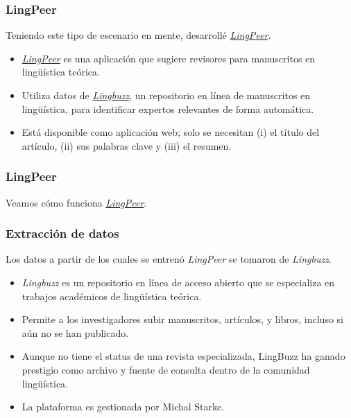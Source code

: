 \documentclass{beamer}
\begin{document}
\begin{frame}
\frametitle{LingPeer}

Teniendo este tipo de escenario en mente, desarrollé \href{https://lingpeer.streamlit.app/}{\alert{\textit{LingPeer}}}.


\begin{itemize}
\item[\ding{52}] \href{https://lingpeer.streamlit.app/}{\alert{\textit{LingPeer}}} es una aplicación que sugiere revisores para manuscritos en lingüística teórica.

\item[\ding{52}] Utiliza datos de \href{https://ling.auf.net/lingbuzz/lingbuzz}{\alert{\textit{Lingbuzz}}}, un repositorio en línea de manuscritos en lingüística, para identificar expertos relevantes de forma automática.

\item[\ding{52}] Está disponible como aplicación web; solo se necesitan (i) el título del artículo, (ii) sus palabras clave y (iii) el resumen.

\end{itemize}

\end{frame}

\begin{frame}
\frametitle{LingPeer}

Veamos cómo funciona \href{https://lingpeer.streamlit.app/}{\alert{\textit{LingPeer}}}.

\end{frame}



\begin{frame}
\frametitle{Extracción de datos}

Los datos a partir de los cuales se entrenó \alert{\textit{LingPeer}} se tomaron de \alert{\textit{Lingbuzz}}.

\begin{itemize}
\item[\ding{229}] \alert{\textit{Lingbuzz}} es un repositorio en línea de acceso abierto que se especializa en trabajos académicos de lingüística teórica.

\item[\ding{229}] Permite a los investigadores subir manuscritos, artículos, y libros, incluso si aún no se han publicado.

\item[\ding{229}] Aunque no tiene el status de una revista especializada, LingBuzz ha ganado prestigio como archivo y fuente de consulta dentro de la comunidad lingüística.

\item[\ding{229}] La plataforma es gestionada por Michal Starke.

\end{itemize}


\end{frame}
\end{document}
